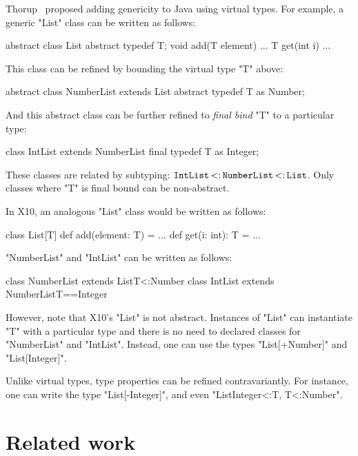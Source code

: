\documentclass[preprint,nocopyrightspace,9pt]{sigplanconf}
\begin{document}
Thorup~\cite{thorup97}
proposed adding genericity to Java using virtual types.  For example,
a generic \xcd"List" class can be written as follows:
\begin{xten}
abstract class List {
    abstract typedef T;
    void add(T element) { ... }
    T get(int i) { ... }
}
\end{xten}
This class can be refined by bounding the virtual type \xcd"T" above:
\begin{xten}
abstract class NumberList extends List {
    abstract typedef T as Number;
}
\end{xten}
And this abstract class can be further refined to \emph{final bind}
\xcd"T" to a particular type:
\begin{xten}
class IntList extends NumberList {
    final typedef T as Integer;
}
\end{xten}
These classes are related by subtyping:
${\tt IntList} \subtype {\tt NumberList} \subtype {\tt List}$.
Only classes where \xcd"T" is final bound can be non-abstract.

In X10, an analogous \xcd"List" class would be written as follows:
\begin{xten}
class List[T] {
    def add(element: T) = { ... }
    def get(i: int): T = { ... }
}
\end{xten}

\xcd"NumberList" and \xcd"IntList" can be written as follows:
\begin{xten}
class NumberList extends List{T<:Number} { }
class IntList extends NumberList{T==Integer} { }
\end{xten}

However, note that X10's \xcd"List" is not abstract.
Instances of \xcd"List"
can instantiate \xcd"T" with a particular type and there is no need to declared classes for \xcd"NumberList" and \xcd"IntList".  Instead, one can use the types
\xcd"List[+Number]" and \xcd"List[Integer]".

Unlike virtual types, type properties can be refined contravariantly.
For instance, one can write the type \xcd"List[-Integer]",
and even \xcd"List{Integer<:T, T<:Number}".


\section{Related work}

\cite{unifying-genericity}
\cite{adding-wildcards}
\cite{emir06}
\cite{myers94}
\cite{polyj}
\cite{allen04}
\cite{allen03}
\cite{beta}
\cite{mp89-virtual-classes}
\cite{thorup97}
\end{document}
